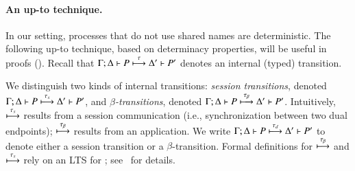\documentclass[runningheads]{llncs}
\begin{document}
{%
%
%
%


\paragraph{An up-to technique.}
In our setting, processes that do not use shared names are deterministic. 
The following up-to technique, based on determinacy properties, will be useful in proofs ().
Recall that $\Gamma; \Delta \vdash P \stackrel{\tau}{\longmapsto} \Delta' \vdash P'$ denotes an internal (typed) transition.
 
 \begin{notation}
 \label{not:dettrans}
We distinguish two kinds of  internal transitions:
\emph{session transitions}, denoted 
$\Gamma; \Delta \vdash P \stackrel{\tau_{s}}{\longmapsto} \Delta' \vdash P'$,
and 
\emph{$\beta$-transitions}, denoted $\Gamma; \Delta \vdash P \stackrel{\tau_{\beta}}{\longmapsto} \Delta' \vdash P'$.
Intuitively, $\stackrel{\tau_{s}}{\longmapsto}$  results from a session communication (i.e., synchronization between
two dual endpoints); 
  $\stackrel{\tau_{\beta}}{\longmapsto}$ results from an application. 
 We write  $\Gamma; \Delta \vdash P \stackrel{\tau_{d}}{\longmapsto} \Delta' \vdash P'$ to denote
	either a session transition or a $\beta$-transition.
	Formal definitions for $\stackrel{\tau_{\beta}}{\longmapsto}$  and $\stackrel{\tau_{s}}{\longmapsto}$ rely on an LTS for \HOp; see~\cite{KouzapasPY15} for details.
 \end{notation}
 
}
\end{document}
